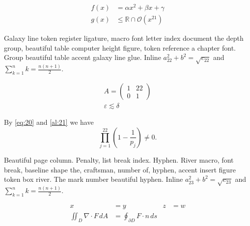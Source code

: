 \documentclass{article}
\begin{document}
\begin{align}
f(x) &= \alpha x^2 + \beta x + \gamma \label{al:21}\\
g(x) &\leq \mathbb{R}\cap\mathcal{O}(x^{21})
\end{align}

Galaxy line token register ligature, macro font letter index document
the depth group, beautiful table computer height figure, token
reference a chapter font. Group beautiful table accent galaxy line
glue. Inline $a_{22}^2+b^2=\sqrt{c_22}$ and $\sum_{k=1}^{n} k=\frac{n(n+1)}{2}$.

\begin{gather}
A = \begin{pmatrix} 1 & 22 \\ 0 & 1\end{pmatrix}\\
\varepsilon \lesssim \delta\nonumber
\end{gather}

By \eqref{eq:20} and \eqref{al:21} we have \[ \prod_{j=1}^{22} \left(1-\frac{1}{p_j}\right) \neq 0. \]

Beautiful page column. Penalty, list break index. Hyphen. River macro,
font break, baseline shape the, craftsman, number of, hyphen, accent
insert figure token box river. The mark number beautiful hyphen. Inline $a_{23}^2+b^2=\sqrt{c_23}$ and $\sum_{k=1}^{n} k=\frac{n(n+1)}{2}$.

\begin{align*}
x &= y & z &= w\\
\iint_D \nabla\cdot F\,dA &= \oint_{\partial D} F\cdot n\,ds
\end{align*}
\end{document}
